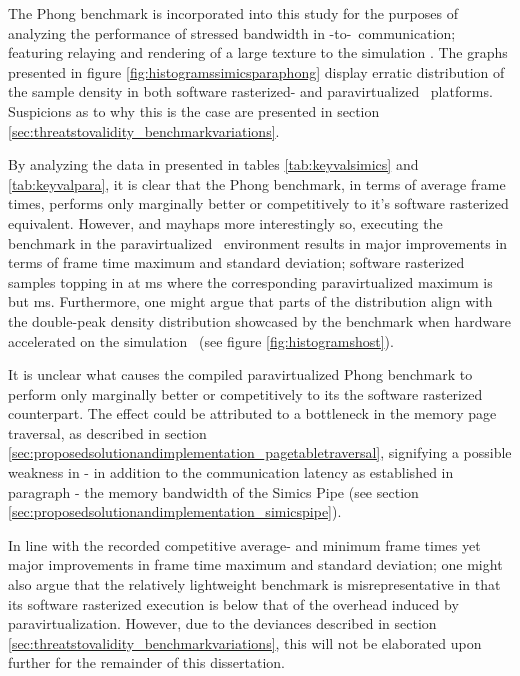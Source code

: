 The Phong benchmark is incorporated into this study for the purposes of analyzing the performance of stressed bandwidth in \dvttermtarget -to-\dvttermhost\ communication; featuring relaying and rendering of a large texture to the simulation \dvttermhost .
The graphs presented in figure \ref{fig:histogramssimicsparaphong} display erratic distribution of the sample density in both software rasterized- and paravirtualized \dvttermsimics\ platforms.
Suspicions as to why this is the case are presented in section \ref{sec:threatstovalidity_benchmarkvariations}.

By analyzing the data in presented in tables \ref{tab:keyvalsimics} and \ref{tab:keyvalpara}, it is clear that the Phong benchmark, in terms of average frame times, performs only marginally better or competitively to it's software rasterized equivalent.
However, and mayhaps more interestingly so, executing the benchmark in the paravirtualized \dvttermsimics\ environment results in major improvements in terms of frame time maximum and standard deviation; software rasterized samples topping in at  ms where the corresponding paravirtualized maximum is but  ms.
Furthermore, one might argue that parts of the distribution align with the double-peak density distribution showcased by the benchmark when hardware accelerated on the simulation \dvttermhost\ (see figure \ref{fig:histogramshost}).

It is unclear what causes the compiled paravirtualized Phong benchmark to perform only marginally better or competitively to its the software rasterized counterpart.
The effect could be attributed to a bottleneck in the memory page traversal, as described in section \ref{sec:proposedsolutionandimplementation_pagetabletraversal}, signifying a possible weakness in - in addition to the communication latency as established in paragraph  - the memory bandwidth of the Simics Pipe (see section \ref{sec:proposedsolutionandimplementation_simicspipe}).

In line with the recorded competitive average- and minimum frame times yet major improvements in frame time maximum and standard deviation; one might also argue that the relatively lightweight benchmark is misrepresentative in that its software rasterized execution is below that of the overhead induced by paravirtualization.
However, due to the deviances described in section \ref{sec:threatstovalidity_benchmarkvariations}, this will not be elaborated upon further for the remainder of this dissertation.

